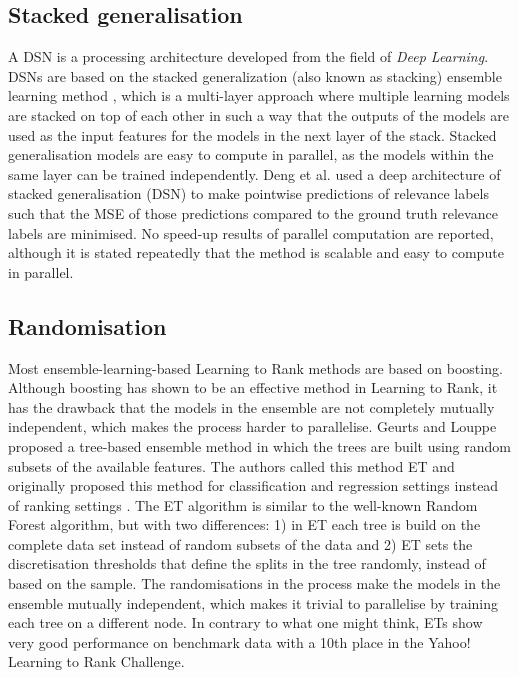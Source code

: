 \subsection{Stacked generalisation}
A \ac{DSN} is a processing architecture developed from the field of \emph{Deep Learning}. \ac{DSN}s are based on the stacked generalization (also known as stacking) ensemble learning method \cite{Wolpert1992}, which is a multi-layer approach where multiple learning models are stacked on top of each other in such a way that the outputs of the models are used as the input features for the models in the next layer of the stack. Stacked generalisation models are easy to compute in parallel, as the models within the same layer can be trained independently. Deng et al. \cite{Deng2013} used a deep architecture of stacked generalisation (\ac{DSN}) to make pointwise predictions of relevance labels such that the \ac{MSE} of those predictions compared to the ground truth relevance labels are minimised. No speed-up results of parallel computation are reported, although it is stated repeatedly that the method is scalable and easy to compute in parallel.

\subsection{Randomisation}
Most ensemble-learning-based Learning to Rank methods are based on boosting. Although boosting has shown to be an effective method in Learning to Rank, it has the drawback that the models in the ensemble are not completely mutually independent, which makes the process harder to parallelise. Geurts and Louppe \cite{Geurts2011} proposed a tree-based ensemble method in which the trees are built using random subsets of the available features. The authors called this method \ac{ET} and originally proposed this method for classification and regression settings instead of ranking settings \cite{Geurts2006}. The \ac{ET} algorithm is similar to the well-known Random Forest algorithm, but with two differences: 1) in \ac{ET} each tree is build on the complete data set instead of random subsets of the data and 2) \ac{ET} sets the discretisation thresholds that define the splits in the tree randomly, instead of based on the sample. The randomisations in the process make the models in the ensemble mutually independent, which makes it trivial to parallelise by training each tree on a different node. In contrary to what one might think, \ac{ET}s show very good performance on benchmark data with a 10th place in the Yahoo! Learning to Rank Challenge.\\

